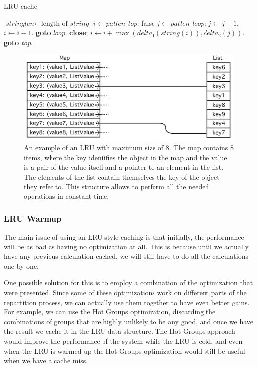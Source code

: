 \begin{algorithm}
  \caption{LRU cache}\label{alg:lru}
  \begin{algorithmic}[1]
  \State $\textit{stringlen} \gets \text{length of }\textit{string}$
  \State $i \gets \textit{patlen}$
  \State \emph{top}:
   \Return false
  \EndIf
  \State $j \gets \textit{patlen}$
  \State \emph{loop}:
  \State $j \gets j-1$.
  \State $i \gets i-1$.
  \State \textbf{goto} \emph{loop}.
  \State \textbf{close};
  \EndIf
  \State $i \gets i+\max(\textit{delta}_1(\textit{string}(i)),\textit{delta}_2(j))$.
  \State \textbf{goto} \emph{top}.
  \EndProcedure
  \end{algorithmic}
  \end{algorithm}

\begin{figure}[!htb]
  \centering
  \includegraphics[width=\textwidth,height=\textheight,keepaspectratio]{img/lru.png}
  \caption[caption]{An example of an LRU with maximum size of 8. The map contains 8 items, where the key identifies the object in the map and the value is a pair of the value itself and a pointer to an element in the list. The elements of the list contain themselves the key of the object they refer to. This structure allows to perform all the needed operations in constant time. }
  \label{fig:lru}
\end{figure}

\subsubsection{LRU Warmup}\label{sec:warmup}
The main issue of using an LRU-style caching is that initially, the performance will be as bad as having no optimization at all. This is because until we actually have any previous calculation cached, we will still have to do all the calculations one by one. 

One possible solution for this is to employ a combination of the optimization that were presented. Since some of these optimizations work on different parts of the repartition process, we can actually use them together to have even better gains. For example, we can use the Hot Groups optimization, discarding the combinations of groups that are highly unlikely to be any good, and once we have the result we cache it in the LRU data structure. The Hot Groups approach would improve the performance of the system while the LRU is cold, and even when the LRU is warmed up the Hot Groups optimization would still be useful when we have a cache miss.

